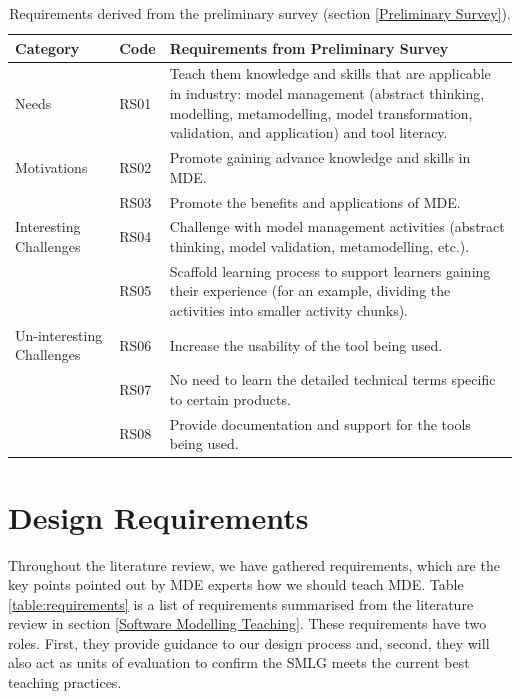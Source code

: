 \documentclass[12pt, a4paper]{report}
\begin{document}
{\begin{table}[ht]
\caption{Requirements derived from the preliminary survey (section \ref{Preliminary Survey}).}
\label{table:preliminary-survey}
\begin{center}
\begin{tabular}{ p{2cm}p{1cm}p{10cm} } 
\hline
Category & Code & Requirements from Preliminary Survey \\
\hline
\multirow{1}{2cm}{Needs} 
& RS01 & Teach them knowledge and skills that are applicable in industry: model management (abstract thinking, modelling, metamodelling, model transformation, validation, and application) and tool literacy. \\ 
\hline
\multirow{1}{2cm}{Motivations}
& RS02 & Promote gaining advance knowledge and skills in MDE. \\ 
& RS03 & Promote the benefits and applications of MDE. \\ 
\hline
\multirow{1}{2cm}{Interesting Challenges}
& RS04 & Challenge with model management activities (abstract thinking, model validation, metamodelling, etc.). \\ 
& RS05 & Scaffold learning process to support learners gaining their experience (for an example, dividing the activities into smaller activity chunks). \\ 
\hline
\multirow{1}{2cm}{Un-interesting Challenges}
& RS06 & Increase the usability of the tool being used. \\ 
& RS07 & No need to learn the detailed technical terms specific to certain products. \\ 
& RS08 & Provide documentation and support for the tools being used. \\ 
\hline
\end{tabular}
\end{center}
\end{table}

\section{Design Requirements}
\label{Design Requirements}
Throughout the literature review, we have gathered requirements, which are the key points pointed out by MDE experts how we should teach MDE. Table \ref{table:requirements} is a list of requirements summarised from the literature review in section \ref{Software Modelling Teaching}. These requirements have two roles. First, they provide guidance to our design process and, second, they will also act as units of evaluation to confirm the SMLG meets the current best teaching practices. 
 
}
\end{document}
